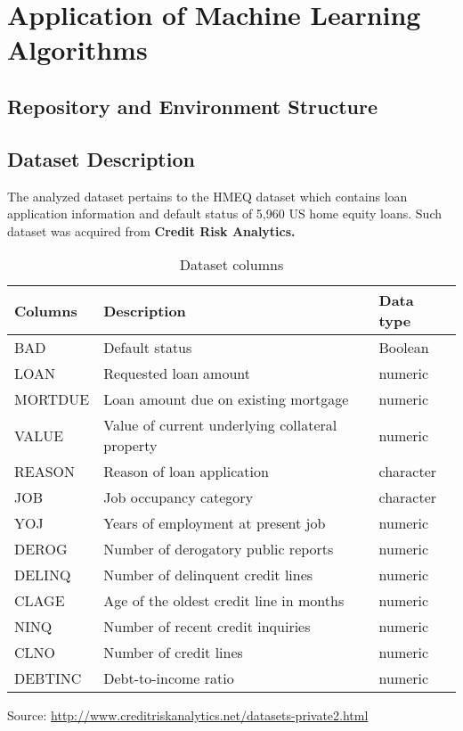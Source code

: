 \chapter{Application of Machine Learning Algorithms}
\label{chap:four}

\section{Repository and Environment Structure}
\section{Dataset Description}
The analyzed dataset pertains to the HMEQ dataset which contains loan application information and default status of 5,960 US home equity loans. Such dataset was acquired from \bfseries{Credit Risk Analytics}.


\begin{table}[!htbp]
	\small
	\setlength{\tabcolsep}{8pt}
	\renewcommand{\arraystretch}{1.3}
	\begin{center}
		\caption[Dataset columns]{Dataset columns}\label{tab:values}
	\begin{tabular}{@{} l p{8cm} l @{}}
	\toprule
	\textbf{Columns} & \textbf{Description} & \textbf{Data type}\\
	\midrule
	BAD & Default status & Boolean \\
	\hline

	LOAN & Requested loan amount & numeric \\
	\hline
	MORTDUE & Loan amount due on existing mortgage & numeric \\
	\hline
	VALUE & Value of current underlying collateral property & numeric \\
	\hline
	REASON & Reason of loan application & character \\
	\hline
	JOB & Job occupancy category & character \\
	\hline
	YOJ & Years of employment at present job & numeric \\
	\hline
	DEROG & Number of derogatory public reports & numeric \\
	\hline
	DELINQ & Number of delinquent credit lines & numeric \\
	\hline
	CLAGE & Age of the oldest credit line in months & numeric \\
	\hline
	NINQ & Number of recent credit inquiries & numeric \\
	\hline
	CLNO & Number of credit lines & numeric \\
	\hline
	DEBTINC & Debt-to-income ratio & numeric \\
	\bottomrule
	\end{tabular}  
	\end{center}
	\begin{source}Source: \url{http://www.creditriskanalytics.net/datasets-private2.html}\end{source}
\end{table}




